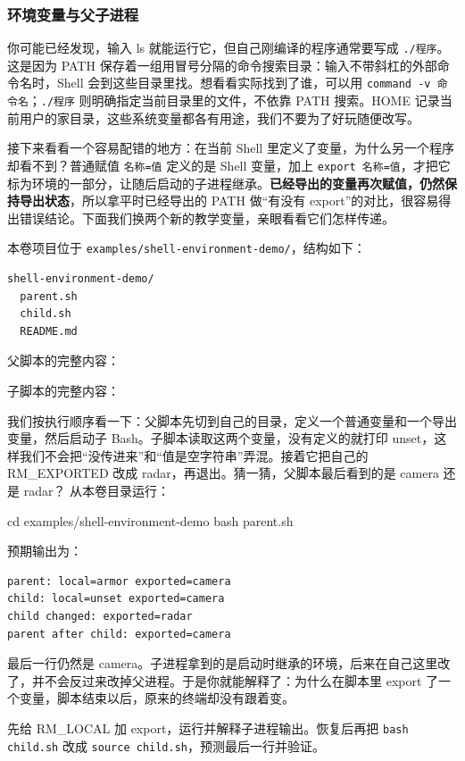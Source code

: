 \subsubsection{环境变量与父子进程}
\label{sec:shell-environment}
你可能已经发现，输入 ls 就能运行它，但自己刚编译的程序通常要写成 \texttt{./程序}。这是因为 PATH 保存着一组用冒号分隔的命令搜索目录：输入不带斜杠的外部命令名时，Shell 会到这些目录里找。想看看实际找到了谁，可以用 \texttt{command -v 命令名}；\texttt{./程序} 则明确指定当前目录里的文件，不依靠 PATH 搜索。HOME 记录当前用户的家目录，这些系统变量都各有用途，我们不要为了好玩随便改写。

接下来看看一个容易配错的地方：在当前 Shell 里定义了变量，为什么另一个程序却看不到？普通赋值 \texttt{名称=值} 定义的是 Shell 变量，加上 \texttt{export 名称=值}，才把它标为环境的一部分，让随后启动的子进程继承。\textbf{已经导出的变量再次赋值，仍然保持导出状态}，所以拿平时已经导出的 PATH 做“有没有 export”的对比，很容易得出错误结论。下面我们换两个新的教学变量，亲眼看看它们怎样传递。
\begin{example}[父进程的环境怎样传给子进程]
本卷项目位于 \texttt{examples/shell-environment-demo/}，结构如下：
\begin{lstlisting}[language={},frame=single]
shell-environment-demo/
  parent.sh
  child.sh
  README.md
\end{lstlisting}
父脚本的完整内容：



子脚本的完整内容：



我们按执行顺序看一下：父脚本先切到自己的目录，定义一个普通变量和一个导出变量，然后启动子 Bash。子脚本读取这两个变量，没有定义的就打印 unset，这样我们不会把“没传进来”和“值是空字符串”弄混。接着它把自己的 RM\_EXPORTED 改成 radar，再退出。猜一猜，父脚本最后看到的是 camera 还是 radar？
从本卷目录运行：


\begin{tbash}
cd examples/shell-environment-demo
bash parent.sh
\end{tbash}


预期输出为：
\begin{lstlisting}[language={},frame=single]
parent: local=armor exported=camera
child: local=unset exported=camera
child changed: exported=radar
parent after child: exported=camera
\end{lstlisting}
最后一行仍然是 camera。子进程拿到的是启动时继承的环境，后来在自己这里改了，并不会反过来改掉父进程。于是你就能解释了：为什么在脚本里 export 了一个变量，脚本结束以后，原来的终端却没有跟着变。
\end{example}
\begin{exercise}\label{ex:v1-shell-inheritance}
先给 RM\_LOCAL 加 export，运行并解释子进程输出。恢复后再把 \texttt{bash child.sh} 改成 \texttt{source child.sh}，预测最后一行并验证。
\end{exercise}

